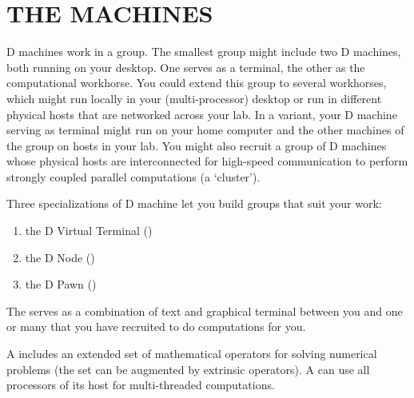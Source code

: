\chapter{THE  MACHINES}\label{chap:cluster}
%
%
%
%

D machines work in a group. The smallest group might include two D
machines, both running on your desktop. One serves as a terminal, the
other as the computational workhorse. You could extend this group to
several workhorses, which might run locally in your (multi-processor)
desktop or run in different physical hosts that are networked across
your lab. In a variant, your D machine serving as terminal might run
on your home computer and the other machines of the group on hosts in
your lab. You might also recruit a group of D machines whose physical
hosts are interconnected for high-speed communication to perform
strongly coupled parallel computations (a `cluster').

Three specializations of D machine let you build groups that suit your work:

\begin{enumerate}
\item the D Virtual Terminal ()
\item the D Node ()
\item the D Pawn ()
\end{enumerate}

\noindent The  serves as a combination of text and graphical
terminal between you and one or many  that you have
recruited to do computations for you.

A  includes an extended set of mathematical operators for
solving numerical problems (the set can be augmented by extrinsic
operators). A  can use all processors of its host for
multi-threaded computations.

